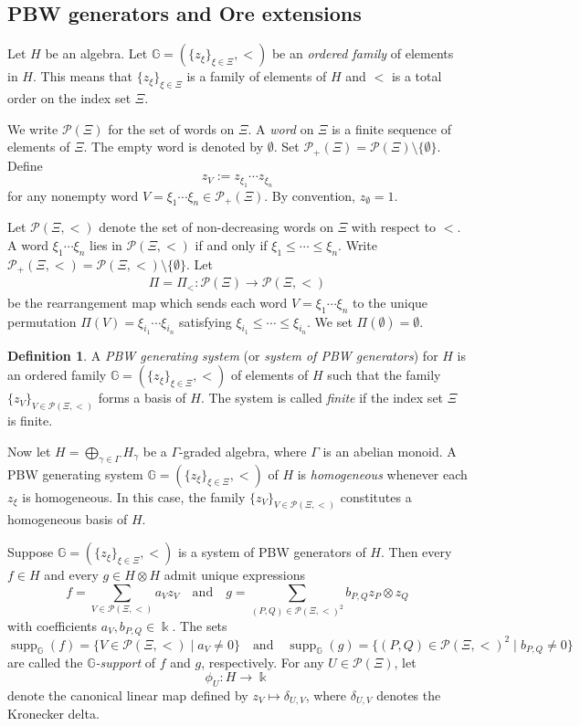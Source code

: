 \documentclass{article}
\theoremstyle{plain}
\theoremstyle{definition}
\newtheorem{definition}[thm]{Definition}
\numberwithin{equation}{section}
\DeclareMathOperator{\supp}{supp}
\newcommand{\PP}{\mathcal{P}}
\newcommand{\GG}{\mathbb{G}}
\begin{document}
	
	
	\subsection{PBW generators and Ore extensions}
	Let $H$ be an algebra. Let $\GG = (\{z_{\xi}\}_{\xi\in \Xi}, <)$ be an \emph{ordered family} of elements in $H$. This means that $\{z_{\xi}\}_{\xi\in \Xi}$ is a family of elements of $H$ and $<$ is a total order on the index set $\Xi$.
	
	We write $\PP(\Xi)$ for the set of words on $\Xi$. A \emph{word} on $\Xi$ is a finite sequence of elements of $\Xi$. The empty word is denoted by $\emptyset$. Set $\PP_{+}(\Xi) = \PP(\Xi)\setminus\{\emptyset\}$. Define 
	\[
	z_{V} := z_{\xi_{1}}\cdots z_{\xi_{n}}
	\]
	for any nonempty word $V=\xi_{1}\cdots \xi_{n}\in \PP_{+}(\Xi)$.
	By convention, $z_{\emptyset} = 1$.
	
	Let $\PP(\Xi, <)$ denote the set of non-decreasing words on $\Xi$ with respect to $<$. A word $\xi_{1}\cdots\xi_{n}$ lies in $\PP(\Xi,<)$ if and only if $\xi_{1}\leq \cdots\leq \xi_{n}$. Write $\PP_{+}(\Xi,<) = \PP(\Xi,<)\setminus\{\emptyset\}$. Let
	\begin{eqnarray}\label{rearrangement-map}
		\Pi=\Pi_{<}\colon \PP(\Xi)\to \PP(\Xi,<)
	\end{eqnarray}
	be the rearrangement map which sends each word $V=\xi_{1}\cdots\xi_{n}$ to the unique permutation $\Pi(V)=\xi_{i_{1}}\cdots\xi_{i_{n}}$ satisfying $\xi_{i_{1}}\leq \cdots\leq \xi_{i_{n}}$. We set $\Pi(\emptyset)=\emptyset$.
	
	\begin{definition}\label{definition-PBW-generating-system}
		A \emph{PBW generating system} (or \emph{system of PBW generators}) for $H$ is an ordered family
		$\GG=(\{z_{\xi}\}_{\xi\in \Xi}, <)$ of elements of $H$ such that the family $\{z_V\}_{V\in \PP(\Xi,<)}$ forms a basis of $H$. The system is called \emph{finite} if the index set $\Xi$ is finite.
		
		Now let $H=\bigoplus_{\gamma\in \Gamma}H_{\gamma}$ be a $\Gamma$-graded algebra, where $\Gamma$ is an abelian monoid. A PBW generating system $\GG=(\{z_{\xi}\}_{\xi\in \Xi}, <)$ of $H$ is \emph{homogeneous} whenever each $z_{\xi}$ is homogeneous. In this case, the family $\{z_V\}_{V\in \PP(\Xi,<)}$ constitutes a homogeneous basis of $H$.
	\end{definition}
	
	Suppose $\GG=(\{z_\xi\}_{\xi \in\Xi},<)$ is a system of PBW generators of $H$. Then every $f\in H$ and every $g\in H\otimes H$ admit unique expressions
	\[
	f= \sum_{V\in \PP(\Xi,<)} a_{V} z_{V} \quad \text{and} \quad g = \sum_{(P,Q)\in \PP(\Xi, <)^{2}} b_{P,Q} z_{P} \otimes z_{Q}
	\]
	with coefficients $a_{V}, b_{P,Q}\in \Bbbk$. The sets
	\[
	\supp_{\GG}(f)=\{V \in \PP(\Xi,<) \mid a_{V}\neq0\} \quad \text{and} \quad \supp_{\GG}(g) = \{ (P,Q) \in \PP(\Xi, <)^{2} \mid b_{P,Q} \neq 0 \}
	\]
	are called the \emph{$\GG$-support} of $f$ and $g$, respectively. For any $U\in \PP(\Xi)$, let
	\[
	\phi_{U}\colon H\to \Bbbk
	\]
	denote the canonical linear map defined by $z_{V} \mapsto \delta_{U,V}$, where $\delta_{U,V}$ denotes the Kronecker delta.
	
\end{document}

